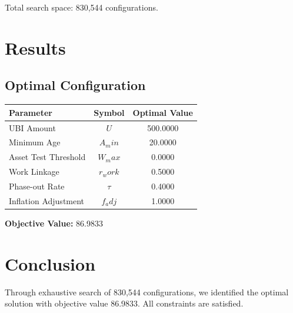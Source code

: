 \documentclass[11pt,a4paper]{article}
\begin{document}
Total search space: 830,544 configurations.

\section{Results}

\subsection{Optimal Configuration}

\begin{center}
\begin{tabular}{|l|c|c|}
\hline
Parameter & Symbol & Optimal Value \\
\hline
UBI Amount & $U$ & 500.0000 \\
Minimum Age & $A_min$ & 20.0000 \\
Asset Test Threshold & $W_max$ & 0.0000 \\
Work Linkage & $r_work$ & 0.5000 \\
Phase-out Rate & $τ$ & 0.4000 \\
Inflation Adjustment & $f_adj$ & 1.0000 \\
\hline
\end{tabular}
\end{center}

\textbf{Objective Value:} 86.9833

\section{Conclusion}

Through exhaustive search of 830,544 configurations, we identified the optimal solution with objective value 86.9833. All constraints are satisfied.
\end{document}
